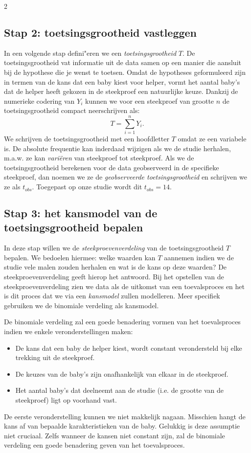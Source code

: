 \begin{multicols}{2}
\subsection*{Stap 2: toetsingsgrootheid vastleggen}
In een volgende stap defini"eren we een \emph{toetsingsgrootheid} \(T\). De toetsingsgrootheid vat informatie uit de data samen op een manier die aansluit bij de hypothese die je wenst te toetsen. Omdat de hypotheses geformuleerd zijn in termen van de kans dat een baby kiest voor helper, vormt het aantal baby's dat de helper heeft gekozen in de steekproef een natuurlijke keuze. Dankzij de numerieke codering van \(Y_i\) kunnen we voor een steekproef van grootte $n$ de toetsingsgrootheid compact neerschrijven als:
\[
T = \sum_{i=1}^n Y_i. 
\]
We schrijven de toetsingsgrootheid met een hoofdletter \(T\) omdat ze een variabele is. De absolute frequentie kan inderdaad wijzigen als we de studie herhalen, m.a.w. ze kan \emph{vari\"eren} van steekproef tot steekproef. Als we de toetsingsgrootheid berekenen voor de data geobserveerd in de specifieke steekproef, dan noemen we ze de \emph{geobserveerde toetsingsgrootheid} en schrijven we ze als \(t_{obs}\). Toegepast op onze studie wordt dit \(t_{obs}=14\).

\subsection*{Stap 3: het kansmodel van de toetsingsgrootheid bepalen}


In deze stap  willen we de \emph{steekproevenverdeling} van de toetsingsgrootheid \(T\) bepalen. We bedoelen hiermee: welke waarden kan \(T\) aannemen indien we de studie vele malen zouden herhalen en wat is de kans op deze waarden? De steekproevenverdeling geeft hierop het antwoord. Bij het opstellen van de steekproevenverdeling zien we data als de uitkomst van een toevalsproces en het is dit proces dat we via een \emph{kansmodel} zullen modelleren. Meer specifiek gebruiken we de binomiale verdeling als kansmodel. 

De binomiale verdeling zal een goede benadering vormen van het toevalsproces indien we enkele veronderstellingen maken:

\begin{itemize}
\item
  De kans dat een baby de helper kiest, wordt constant verondersteld bij elke trekking uit de steekproef.
\item
  De keuzes van de baby's zijn onafhankelijk van elkaar in de steekproef.
 \item 
 Het aantal baby's dat deelneemt aan de studie (i.e. de grootte van de steekproef) ligt op voorhand vast. 
\end{itemize}
De eerste veronderstelling kunnen we niet makkelijk nagaan. Misschien hangt de kans af van bepaalde karakteristieken van de baby. Gelukkig is deze assumptie niet cruciaal. Zelfs wanneer de kansen niet constant zijn, zal de binomiale verdeling een goede benadering geven van het toevalsproces. 


\end{multicols}
